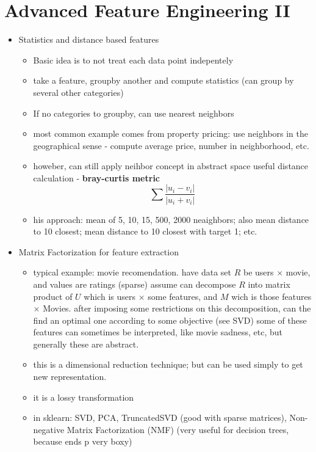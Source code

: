 \documentclass[a4paper]{report}
\begin{document}
\section{Advanced Feature Engineering II}
\begin{itemize}
  \item Statistics and distance based features
    \begin{itemize}
      \item Basic idea is to not treat each data point indepentely
      \item take a feature, groupby another and compute statistics (can group by several other categories)
      \item If no categories to groupby, can use nearest neighbors
      \item most common example comes from property pricing: use neighbors in the geographical sense - compute average price, number in neighborhood, etc.
      \item howeber, can still apply neihbor concept in abstract space
	\subitem useful distance calculation - {\bf bray-curtis metric}
	$$ \sum \frac{|u_i - v_i|}{|u_i + v_i|} $$
      \item his approach: mean of 5, 10, 15, 500, 2000 neaighbors; also mean distance to 10 closest; mean distance to 10 closest with target 1; etc.
    \end{itemize}
  \item Matrix Factorization for feature extraction
    \begin{itemize}
      \item typical example: movie recomendation.
	\subitem have data set $R$  be users $\times$ movie, and values are ratings (sparse)
	\subitem assume can decompose $R$ into matrix product of $U$ which is users $\times$ some features, and $M$ wich is those features $\times$ Movies.
	\subitem after imposing some restrictions on this decomposition, can the find an optimal one according to some objective (see SVD)
	\subitem some of these features can sometimes be interpreted, like movie sadness, etc, but generally these are abstract.
      \item this is a dimensional reduction technique; but can be used simply to get new representation.
      \item it is a lossy transformation
      \item in sklearn: SVD, PCA, TruncatedSVD (good with sparse matrices), Non-negative Matrix Factorization (NMF) (very useful for decision trees, because ends p very boxy)

\end{itemize}
\end{itemize}
\end{document}
